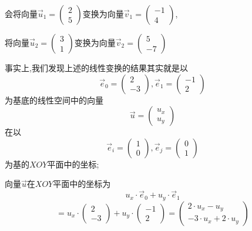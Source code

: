 \documentclass[UTF8]{article}
\begin{document}
会将向量$\vec{u}_1 = \left(
\begin{array}{l}
2 \\ 
5
\end{array}
\right)$变换为向量$\vec{v}_1 = \left(
\begin{array}{l}
-1 \\ 
4
\end{array}
\right)$,

将向量$\vec{u}_2 = \left(
\begin{array}{l}
3 \\ 
1
\end{array}
\right)$变换为向量$\vec{v}_2 = \left(
\begin{array}{l}
5 \\ 
-7
\end{array}
\right)$

事实上,我们发现上述的线性变换的结果其实就是以$$\vec{e}_0 = \left(
\begin{array}{l}
2 \\ 
-3
\end{array}
\right), \vec{e}_1 = \left(
\begin{array}{l}
-1 \\ 
2
\end{array}
\right)$$为基底的线性空间中的向量$$\vec{u} = \left(
\begin{array}{l}
u_x \\ 
u_y
\end{array}
\right)$$在以$$\vec{e}_i = \left(
\begin{array}{l}
1 \\ 
0
\end{array}
\right), \vec{e}_j = \left(
\begin{array}{l}
0 \\ 
1
\end{array}
\right)$$为基的$XOY$平面中的坐标;

向量$\vec{u}$在$XOY$平面中的坐标为
$$u_x\cdot \vec{e}_0 + u_y\cdot \vec{e}_1$$
$$= u_x\cdot \left(
\begin{array}{l}
2 \\ 
-3
\end{array}
\right) + u_y\cdot \left(
\begin{array}{l}
-1 \\ 
2
\end{array}
\right) = \left(
\begin{array}{l}
2\cdot u_x - u_y \\ 
-3\cdot u_x + 2\cdot u_y
\end{array}
\right)$$
\end{document}
